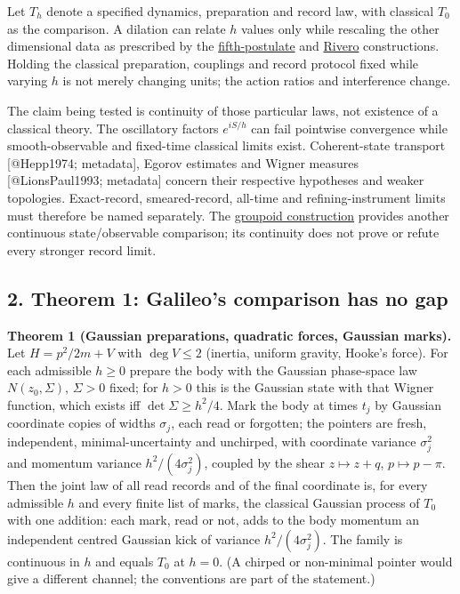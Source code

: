 \documentclass[11pt,a4paper]{article}
\begin{document}
Let \(T_h\) denote a specified dynamics, preparation and record law,
with classical \(T_0\) as the comparison. A dilation can relate \(h\)
values only while rescaling the other dimensional data as prescribed by
the \href{principia-fifth-postulate.md}{fifth-postulate} and
\href{rivero-1998-conjecture-central-forces.md}{Rivero} constructions.
Holding the classical preparation, couplings and record protocol fixed
while varying \(h\) is not merely changing units; the action ratios and
interference change.

The claim being tested is continuity of those particular laws, not
existence of a classical theory. The oscillatory factors \(e^{iS/h}\)
can fail pointwise convergence while smooth-observable and fixed-time
classical limits exist. Coherent-state transport {[}@Hepp1974;
metadata{]}, Egorov estimates and Wigner measures {[}@LionsPaul1993;
metadata{]} concern their respective hypotheses and weaker topologies.
Exact-record, smeared-record, all-time and refining-instrument limits
must therefore be named separately. The
\href{groupoid-quantum-newton-states.md}{groupoid construction} provides
another continuous state/observable comparison; its continuity does not
prove or refute every stronger record limit.

\hypertarget{theorem-1-galileos-comparison-has-no-gap}{%
\subsection{2. Theorem 1: Galileo's comparison has no
gap}\label{theorem-1-galileos-comparison-has-no-gap}}

\textbf{Theorem 1 (Gaussian preparations, quadratic forces, Gaussian
marks).} Let \(H=p^2/2m+V\) with \(\deg V\le2\) (inertia, uniform
gravity, Hooke's force). For each admissible \(h\ge0\) prepare the body
with the Gaussian phase-space law \(N(z_0,\Sigma)\), \(\Sigma>0\) fixed;
for \(h>0\) this is the Gaussian state with that Wigner function, which
exists iff \(\det\Sigma\ge h^2/4\). Mark the body at times \(t_j\) by
Gaussian coordinate copies of widths \(\sigma_j\), each read or
forgotten; the pointers are fresh, independent, minimal-uncertainty and
unchirped, with coordinate variance \(\sigma_j^2\) and momentum variance
\(h^2/(4\sigma_j^2)\), coupled by the shear \(z\mapsto z+q\),
\(p\mapsto p-\pi\). Then the joint law of all read records and of the
final coordinate is, for every admissible \(h\) and every finite list of
marks, the classical Gaussian process of \(T_0\) with one addition: each
mark, read or not, adds to the body momentum an independent centred
Gaussian kick of variance \(h^2/(4\sigma_j^2)\). The family is
continuous in \(h\) and equals \(T_0\) at \(h=0\). (A chirped or
non-minimal pointer would give a different channel; the conventions are
part of the statement.)
\end{document}
